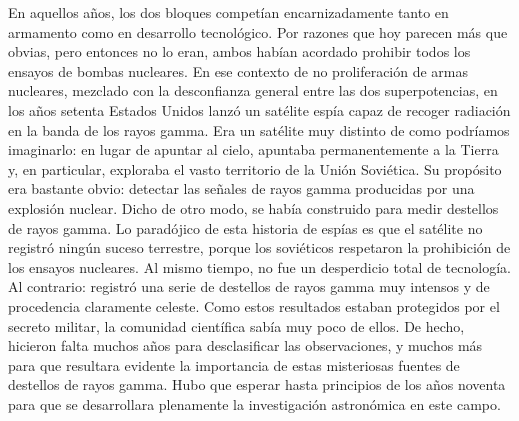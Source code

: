 En aquellos años, los dos bloques competían encarnizadamente tanto en armamento como en desarrollo tecnológico. Por razones que hoy parecen más que obvias, pero entonces no lo eran, ambos habían acordado prohibir todos los ensayos de bombas nucleares. En ese contexto de no proliferación de armas nucleares, mezclado con la desconfianza general entre las dos superpotencias, en los años setenta Estados Unidos lanzó un satélite espía capaz de recoger radiación en la banda de los rayos gamma. Era un satélite muy distinto de como podríamos imaginarlo: en lugar de apuntar al cielo, apuntaba permanentemente a la Tierra y, en particular, exploraba el vasto territorio de la Unión Soviética. Su propósito era bastante obvio: detectar las señales de rayos gamma producidas por una explosión nuclear. Dicho de otro modo, se había construido para medir destellos de rayos gamma. Lo paradójico de esta historia de espías es que el satélite no registró ningún suceso terrestre, porque los soviéticos respetaron la prohibición de los ensayos nucleares. Al mismo tiempo, no fue un desperdicio total de tecnología. Al contrario: registró una serie de destellos de rayos gamma muy intensos y de procedencia claramente celeste. Como estos resultados estaban protegidos por el secreto militar, la comunidad científica sabía muy poco de ellos. De hecho, hicieron falta muchos años para desclasificar las observaciones, y muchos más para que resultara evidente la importancia de estas misteriosas fuentes de destellos de rayos gamma. Hubo que esperar hasta principios de los años noventa para que se desarrollara plenamente la investigación astronómica en este campo.

